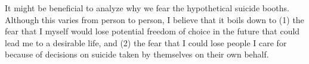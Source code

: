 \documentclass{scrartcl}
\begin{document}
It might be beneficial to analyze why we fear the hypothetical suicide
booths. Although this varies from person to person, I believe that it
boils down to (1) the fear that I myself would lose potential freedom of
choice in the future that could lead me to a desirable life, and (2) the
fear that I could lose people I care for because of decisions on suicide
taken by themselves on their own behalf.
\end{document}
